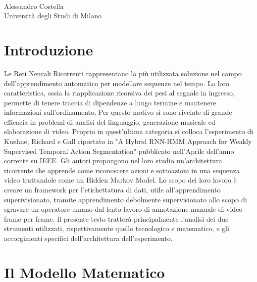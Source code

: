 \documentclass[10pt,letterpaper]{article}
\begin{document}
\vspace*{0.2in}

\begin{flushleft}
\begin{center}
\centering
{\Large
\textbf{
}}
\newline
\\
Alessandro Costella
\\
\bigskip
 Università degli Studi di Milano
\\
\bigskip

\end{center}
\end{flushleft}


\section{Introduzione}
Le Reti Neurali Ricorrenti rappresentano la più utilizzata soluzione nel campo dell'apprendimento automatico per modellare sequenze nel tempo. La loro caratteristica, ossia la riapplicazione ricorsiva dei pesi al segnale in ingresso, permette di tenere traccia di dipendenze a lungo termine e mantenere informazioni sull'ordinamento. Per questo motivo si sono rivelate di grande efficacia in problemi di analisi del linguaggio, generazione musicale ed elaborazione di video. Proprio in quest'ultima categoria si colloca l'esperimento di Kuehne, Richard e Gall riportato in "A Hybrid RNN-HMM Approach for Weakly Supervised Temporal Action Segmentation" pubblicato nell'Aprile dell'anno corrente su IEEE. Gli autori propongono nel loro studio un'architettura ricorrente che apprende come riconoscere azioni e sottoazioni in una sequenza video trattandole come un Hidden Markov Model. Lo scopo del loro lavoro è creare un framework per l'etichettatura di dati, utile all'apprendimento superivisionato, tramite apprendimento debolmente supervisionato allo scopo di sgravare un operatore umano dal lento lavoro di annotazione manuale di video frame per frame. Il presente testo tratterà principalmente l'analisi dei due strumenti utilizzati, rispettivamente quello tecnologico e matematico, e gli accorgimenti specifici dell'architettura dell'esperimento.

\section{Il Modello Matematico}
\end{document}
